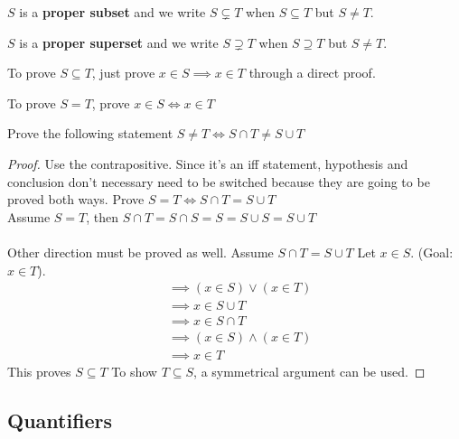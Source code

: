 \documentclass[english, 12pt]{article}
\begin{document}
\begin{defn}
$S$ is a \textbf{proper subset} and we write $S \subsetneq T$ when $S \subseteq T$ but $S \neq T$.
\end{defn}
\begin{defn}
$S$ is a \textbf{proper superset} and we write $S \supsetneq T$ when $S \supseteq T$ but $S \neq T$.
\end{defn}
\begin{mthd}
To prove $S \subseteq T$, just prove $ x \in S \implies x \in T$ through a direct proof.
\begin{center}
To prove $S = T$, prove $ x \in S \iff x \in T$
\end{center}
\end{mthd}

\begin{exmp}
Prove the following statement $S \neq T \iff S \cap T \neq S \cup T$
\begin{proof}
Use the contrapositive. Since it's an iff statement, hypothesis and conclusion don't necessary need to be switched because they are going to be proved both ways. Prove $S = T \iff S \cap T = S \cup T$\\
Assume $S = T$, then $S \cap T = S \cap S = S = S \cup S = S \cup T$\\\\
Other direction must be proved as well. Assume $S \cap T = S \cup T$
Let $x \in S$. (Goal: $x \in T$).
\begin{align*}
&\implies (x \in S) \lor (x \in T) \\
& \implies x \in S \cup T \\
& \implies x \in S \cap T \\
& \implies (x \in S)\land (x \in T) \\
& \implies  x \in T 
\end{align*}
This proves $S \subseteq T$ To show $T \subseteq S$, a symmetrical argument can be used.
\end{proof}
\end{exmp}
\subsection{Quantifiers}
\end{document}
